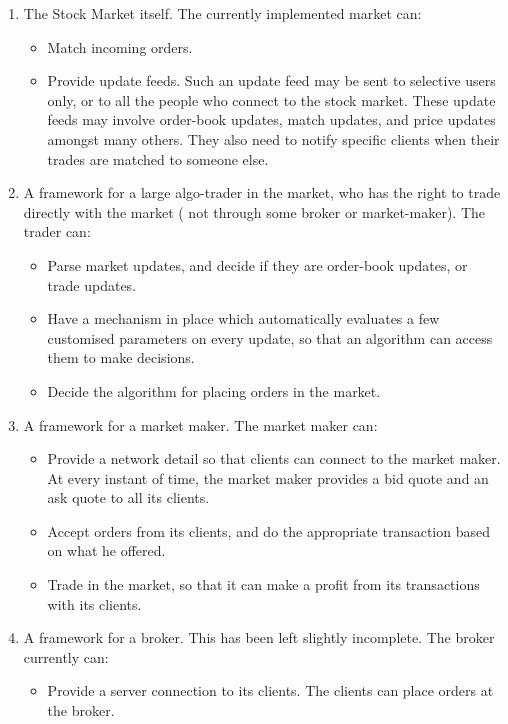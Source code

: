 \documentclass{amsart}
\newenvironment{enumeratenumeric}{\begin{enumerate}[1.] }{\end{enumerate}}
\begin{document}
\begin{enumeratenumeric}
  \item The Stock Market itself. The currently implemented market can:
  \begin{itemize}
    \item Match incoming orders.
    
    \item Provide update feeds. Such an update feed may be sent to selective
    users only, or to all the people who connect to the stock market. These
    update feeds may involve order-book updates, match updates, and price
    updates amongst many others. They also need to notify specific clients
    when their trades are matched to someone else. 
  \end{itemize}
  \item A framework for a large algo-trader in the market, who has the right
  to trade directly with the market ( not through some broker or
  market-maker). The trader can:
  \begin{itemize}
    \item Parse market updates, and decide if they are order-book updates, or
    trade updates.
    
    \item Have a mechanism in place which automatically evaluates a few
    customised parameters on every update, so that an algorithm can access
    them to make decisions.
    
    \item Decide the algorithm for placing orders in the market. 
  \end{itemize}
  \item A framework for a market maker. The market maker can:
  \begin{itemize}
    \item Provide a network detail so that clients can connect to the market
    maker. At every instant of time, the market maker provides a bid quote and
    an ask quote to all its clients.
    
    \item Accept orders from its clients, and do the appropriate transaction
    based on what he offered.
    
    \item Trade in the market, so that it can make a profit from its
    transactions with its clients.
  \end{itemize}
  \item A framework for a broker. This has been left slightly incomplete. The
  broker currently can:
  \begin{itemize}
    \item Provide a server connection to its clients. The clients can place
    orders at the broker.
    

\end{itemize}
\end{enumeratenumeric}
\end{document}
